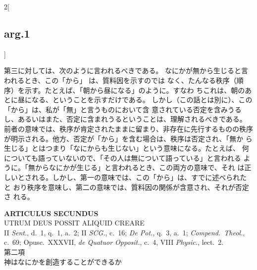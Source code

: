 \documentclass[paper=a4paper,fontsize=10pt,jafontsize=9pt,titlepage]{jlreq}
\begin{document}
\begin{paracol}{2}[\subsection{arg.1}]
\switchcolumn

第三に対しては、次のように言われるべきである。
なにかが無から生じると言われるとき、この「から」 は、質料因を示すのでは
 なく、たんなる秩序（順序）を示す。たとえば、「朝から昼になる」のように。すなわ
 ちこれは、朝のあとに昼になる、ということを示すだけである。
しかし（この話とは別に）、この「から」は、私が「無」と言うものにおいて含
 意されている否定を含みうるし、あるいはまた、否定に含まれうるということは、理解されるべきである。
前者の意味では、秩序が肯定されたままに留まり、非存在に先行するものの秩序
 が明示される。他方、否定が「から」を含む場合は、秩序は否定され、「無か
 ら生じる」とはつまり「なにからも生じない」という意味になる。たとえば、
何についても語っていないので、「その人は無について語っている」と言われる
 ように。「無からなにかが生じる」と言われるとき、この両方の意味で、それ
 は正しいとされる。しかし、第一の意味では、この「から」は、すでに述べられたと
 おり秩序を意味し、第二の意味では、質料因の関係が含意され、それが否定さ
 れる。

\end{paracol}




\newpage
{}
{}
\setcounter{section}{2}
\setcounter{subsection}{0}

\begin{center}
 {\Large {\bfseries ARTICULUS SECUNDUS}}\\
 {\large UTRUM DEUS POSSIT ALIQUID CREARE}\\
 {\footnotesize II {\itshape Sent.}, d.~1, q.~1, a.~2; II {\itshape
 SCG.}, c.~16; {\itshape De Pot.}, q.~3, a.~1; {\itshape
 Compend.~Theol.}, c.~69; Opusc.~XXXVII, {\itshape de Quatuor Opposit.},
 c.~4, VIII {\itshape Physic.}, lect.~2.}\\
 {\Large 第二項\\神はなにかを創造することができるか}
\end{center}
\end{document}
